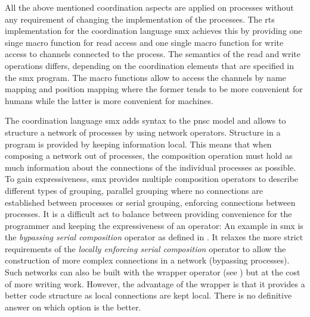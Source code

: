 All the above mentioned coordination aspects are applied on processes without any requirement of changing the implementation of the processes.
The \gls{rts} implementation for the coordination language \gls*{smx} achieves this by providing one singe macro function for read access and one single macro function for write access to channels connected to the process.
The semantics of the read and write operations differs, depending on the coordination elements that are specified in the \gls*{smx} program.
The macro functions allow to access the channels by name mapping and position mapping where the former tends to be more convenient for humans while the latter is more convenient for machines.

The coordination language \gls*{smx} adds syntax to the \gls{pnsc} model and allows to structure a network of processes by using network operators.
Structure in a program is provided by keeping information local.
This means that when composing a network out of processes, the composition operation must hold as much information about the connections of the individual processes as possible.
To gain expressiveness, \gls*{smx} provides multiple composition operators to describe different types of grouping, \eg parallel grouping where no connections are established between processes or serial grouping, \ie enforcing connections between processes.
It is a difficult act to balance between providing convenience for the programmer and keeping the expressiveness of an operator:
An example in \gls*{smx} is the \emph{bypassing serial composition} operator as defined in \Def{\ref{def_smx_so}}.
It relaxes the more strict requirements of the \emph{locally enforcing serial composition} operator to allow the construction of more complex connections in a network (\eg bypassing processes).
Such networks can also be built with the wrapper operator (see \Sect{\ref{sect_smx_network_assign}}) but at the cost of more writing work.
However, the advantage of the wrapper is that it provides a better code structure as local connections are kept local.
There is no definitive answer on which option is the better.

